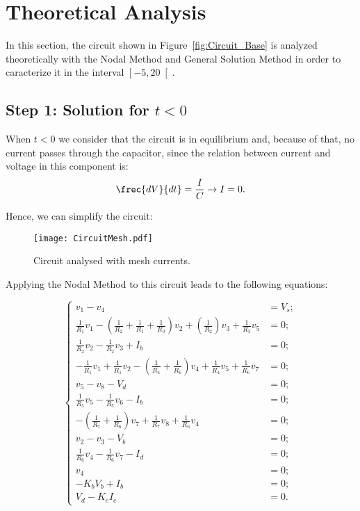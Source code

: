 \section{Theoretical Analysis}
\label{sec:analysis}

In this section, the circuit shown in Figure~\ref{fig:Circuit_Base} is analyzed theoretically with the Nodal Method and General Solution Method in order to caracterize it in the interval $\left[-5,20\right[$.

\subsection{Step 1: Solution for $t<0$}

When $t<0$ we consider that the circuit is in equilibrium and, because of that, no current passes through the capacitor, since the relation between current and voltage in this component is:
\begin{equation}
  \frec{dV}{dt}=\frac{I}{C} \rightarrow I = 0.
  \label{eq:Cap}
\end{equation}

Hence, we can simplify the circuit:
\begin{figure}[h] \centering
\texttt{[image: CircuitMesh.pdf]}
\caption{Circuit analysed with mesh currents.}
\label{fig:Circuit_Passo1}
\end{figure}

Applying the Nodal Method to this circuit leads to the following equations:

\begin{equation}
\begin{cases}
	v_1 - v_4 &= V_s;																				  \\
	\frac{1}{R_1}v_1 - (\frac{1}{R_2}+\frac{1}{R_1}+\frac{1}{R_3})v_2 + (\frac{1}{R_2})v_3 + \frac{1}{R_3}v_5 &= 0; \\
  	\frac{1}{R_2}v_2 - \frac{1}{R_2}v_3+ I_b &= 0;													  \\
  	-\frac{1}{R_1}v_1 + \frac{1}{R_1}v_2 - (\frac{1}{R_4}+\frac{1}{R_6})v_4 + \frac{1}{R_4}v_5 + \frac{1}{R_6}v_7 &= 0;			  																	  \\
	v_5 - v_8 - V_d &= 0;																			  \\
  	\frac{1}{R_5}v_5 - \frac{1}{R_5}v_6 - I_b &= 0;												  	  \\
  	-(\frac{1}{R_7}+\frac{1}{R_6})v_7 + \frac{1}{R_7}v_8 + \frac{1}{R_6}v_4 &= 0;					  \\
	v_2 - v_3 - V_b &= 0;																			  \\
  	\frac{1}{R_6}v_4 - \frac{1}{R_6}v_7 - I_d &= 0;													  \\
  	v_4 &= 0;																						  \\
  	-K_bV_b + I_b &= 0;																				  \\
  	V_d - K_cI_c &= 0.
\end{cases}
\end{equation}

